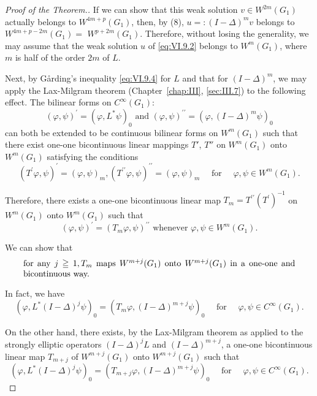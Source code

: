 \begin{proof}[Proof of the Theorem.]
If we can show that this weak solution $v \in W^{2m}(G_1)$ actually belongs to $W^{4m+p}(G_1)$, then, by ($8$), $u =: (I - \Delta)^m v$ belongs to $W^{4m+p-2m}(G_1) =$ 
$W^{p+2m}(G_{1})$. Therefore, without losing the generality, we may assume that the weak solution $u$ of \eqref{eq:VI.9.2} belongs to $W^{m}(G_{1})$, where $m$ is half of the order $2m$ of $L$. 

Next, by Gårding's inequality \eqref{eq:VI.9.4} for $L$ and that for $(I - \Delta)^m$, we may apply the Lax-Milgram theorem (Chapter~\ref{chap:III}, \ref{sec:III.7}) to the following effect. The bilinear forms on $C^\infty(G_1)$: 
\begin{equation}\label{eq:VI.9.9}
(\varphi , \psi) ^{\prime} = (\varphi , L ^{*} \psi) _{0} \text{ and } (\varphi , \psi) ^{\prime \prime} = (\varphi , (I - \Delta) ^{m} \psi) _{0}
\end{equation}
can both be extended to be continuous bilinear forms on $W^{m}(G_{1})$ such that there exist one-one bicontinuous linear mappings $T'$, $T''$ on $W^{m}(G_{1})$ onto $W^{m}(G_{1})$ satisfying the conditions 
\[
(T ^{\prime} \varphi , \psi) ^{\prime} = (\varphi , \psi) _{m}, (T ^{\prime \prime} \varphi , \psi) ^{\prime \prime} = (\varphi , \psi) _{m} \quad \text{ for } \quad \varphi , \psi \in W ^{m} (G _{1}).
\]

Therefore, there exists a one-one bicontinuous linear map $T_{m} = T^{\prime \prime}(T^{\prime})^{-1}$ on $W^{m}(G_{1})$ onto $W^{m}(G_{1})$ such that 
\begin{equation}\label{eq:VI.9.10}
(\varphi , \psi) ^{\prime} = (T _{m} \varphi , \psi) ^{\prime \prime} \text{ whenever } \varphi , \psi \in W ^{m} (G _{1}).
\end{equation}

We can show that 
\begin{equation}
\label{eq:VI.9.11}
\begin{minipage}{0.92\linewidth}
\everymath{}\let\limits\nolimits
for any $j \geqq 1, T _{m}$ maps $W ^{m+j} (G _{1})$ onto $W ^{m+j} (G _{1})$ in a one-one and bicontinuous way.
\end{minipage}
\end{equation}


In fact, we have 
\[
(\varphi , L ^{*} (I - \Delta) ^{j} \psi) _{0} = (T _{m} \varphi , (I - \Delta) ^{m+j} \psi) _{0} \quad \text{ for } \quad \varphi , \psi \in C ^{\infty} (G _{1}).
\]

On the other hand, there exists, by the Lax-Milgram theorem as applied to the strongly elliptic operators $(I-\Delta)^{j}L$ and $(I-\Delta)^{m+j}$, a one-one bicontinuous linear map $T_{m+j}$ of $W^{m+j}(G_{1})$ onto $W^{m+j}(G_{1})$ such that 
\[
(\varphi , L ^{*} (I - \Delta) ^{j} \psi) _{0} = (T _{m+j} \varphi , (I - \Delta) ^{m+j} \psi) _{0} \quad \text{ for } \quad \varphi , \psi \in C ^{\infty} (G _{1}).
\]


\end{proof}
